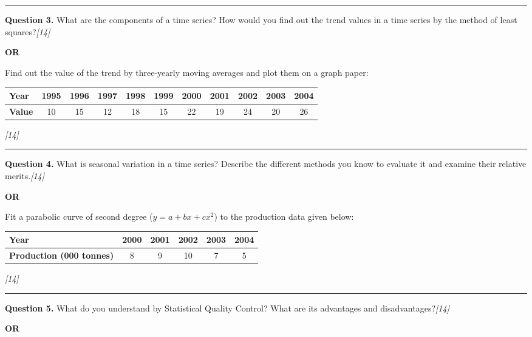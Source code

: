 \documentclass[11pt,a4paper]{article}
\newcommand{\pts}[1]{\hfill   \textit{[#1]}}
\begin{document}
\medskip\rule{\linewidth}{0.2pt}

\pagebreak




\noindent   \textbf{Question 3.}
What are the components of a time series? How would you find out the trend values in a time series by the method of least squares?\pts{14}

\centerline{   \textbf{OR}}

Find out the value of the trend by three-yearly moving averages and plot them on a graph paper:


\begin{center}
\small

\begin{tabular}{|l|c|c|c|c|c|c|c|c|c|c|}
\hline
   \textbf{Year} & 1995 & 1996 & 1997 & 1998 & 1999 & 2000 & 2001 & 2002 & 2003 & 2004 \\
\hline
   \textbf{Value} & 10 & 15 & 12 & 18 & 15 & 22 & 19 & 24 & 20 & 26 \\
\hline
\end{tabular}
\end{center}\pts{14}

\medskip\rule{\linewidth}{0.2pt}




\noindent   \textbf{Question 4.}
What is seasonal variation in a time series? Describe the different methods you know to evaluate it and examine their relative merits.\pts{14}

\centerline{   \textbf{OR}}

Fit a parabolic curve of second degree ($y = a + bx + cx^2$) to the production data given below:


\begin{center}
\small

\begin{tabular}{|l|c|c|c|c|c|}
\hline
   \textbf{Year} & 2000 & 2001 & 2002 & 2003 & 2004 \\
\hline
   \textbf{Production (000 tonnes)} & 8 & 9 & 10 & 7 & 5 \\
\hline
\end{tabular}
\end{center}\pts{14}

\medskip\rule{\linewidth}{0.2pt}




\noindent   \textbf{Question 5.}
What do you understand by Statistical Quality Control? What are its advantages and disadvantages?\pts{14}

\centerline{   \textbf{OR}}
\end{document}
